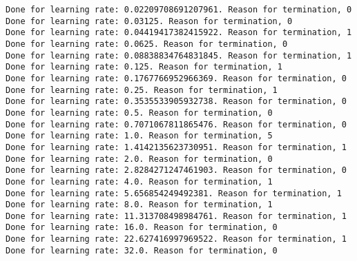 \documentclass[11pt]{article}
\begin{document}
    \begin{Verbatim}[commandchars=\\\{\}]
Done for learning rate: 0.02209708691207961. Reason for termination, 0
Done for learning rate: 0.03125. Reason for termination, 0
Done for learning rate: 0.04419417382415922. Reason for termination, 1
Done for learning rate: 0.0625. Reason for termination, 0
Done for learning rate: 0.08838834764831845. Reason for termination, 1
Done for learning rate: 0.125. Reason for termination, 1
Done for learning rate: 0.1767766952966369. Reason for termination, 0
Done for learning rate: 0.25. Reason for termination, 1
Done for learning rate: 0.3535533905932738. Reason for termination, 0
Done for learning rate: 0.5. Reason for termination, 0
Done for learning rate: 0.7071067811865476. Reason for termination, 0
Done for learning rate: 1.0. Reason for termination, 5
Done for learning rate: 1.4142135623730951. Reason for termination, 1
Done for learning rate: 2.0. Reason for termination, 0
Done for learning rate: 2.8284271247461903. Reason for termination, 0
Done for learning rate: 4.0. Reason for termination, 1
Done for learning rate: 5.656854249492381. Reason for termination, 1
Done for learning rate: 8.0. Reason for termination, 1
Done for learning rate: 11.313708498984761. Reason for termination, 1
Done for learning rate: 16.0. Reason for termination, 0
Done for learning rate: 22.627416997969522. Reason for termination, 1
Done for learning rate: 32.0. Reason for termination, 0

    \end{Verbatim}
\end{document}
